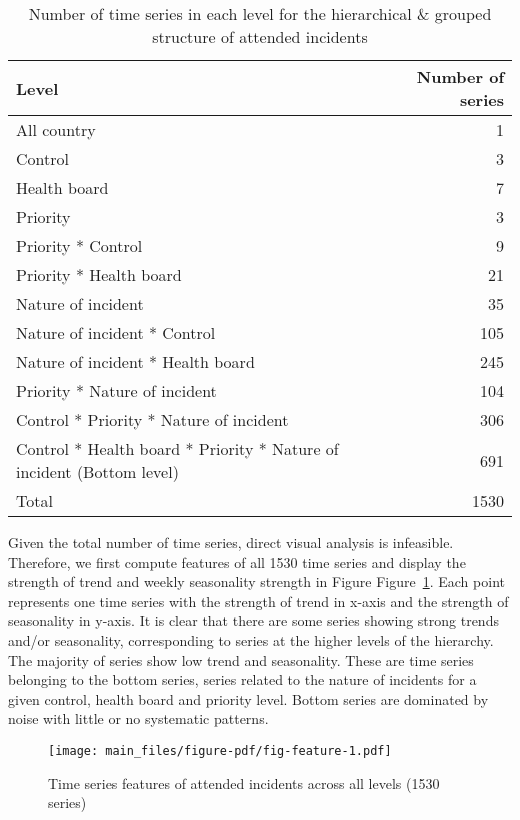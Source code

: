 \documentclass[
  authoryear,
  preprint,
  3p]{elsarticle}
\begin{document}
\hypertarget{tbl-hierarchy}{}
\begin{table}
\caption{\label{tbl-hierarchy}Number of time series in each level for the hierarchical \& grouped
structure of attended incidents }\tabularnewline

\centering
\begin{tabular}{lr}
\toprule
Level & Number of series\\
\midrule
All country & 1\\
Control & 3\\
Health board & 7\\
Priority & 3\\
Priority * Control & 9\\
\addlinespace
Priority * Health board & 21\\
Nature of incident & 35\\
Nature of incident * Control & 105\\
Nature of incident * Health board & 245\\
Priority * Nature of incident & 104\\
\addlinespace
Control * Priority * Nature of incident & 306\\
Control * Health board * Priority * Nature of incident (Bottom level) & 691\\
Total & 1530\\
\bottomrule
\end{tabular}
\end{table}

Given the total number of time series, direct visual analysis is
infeasible. Therefore, we first compute features of all 1530 time series
and display the strength of trend and weekly seasonality strength in
Figure Figure~\ref{fig-feature}. Each point represents one time series
with the strength of trend in x-axis and the strength of seasonality in
y-axis. It is clear that there are some series showing strong trends
and/or seasonality, corresponding to series at the higher levels of the
hierarchy. The majority of series show low trend and seasonality. These
are time series belonging to the bottom series, series related to the
nature of incidents for a given control, health board and priority
level. Bottom series are dominated by noise with little or no systematic
patterns.

\begin{figure}

{\centering \texttt{[image: main\_files/figure-pdf/fig-feature-1.pdf]}

}

\caption{\label{fig-feature}Time series features of attended incidents
across all levels (1530 series)}

\end{figure}
\end{document}
